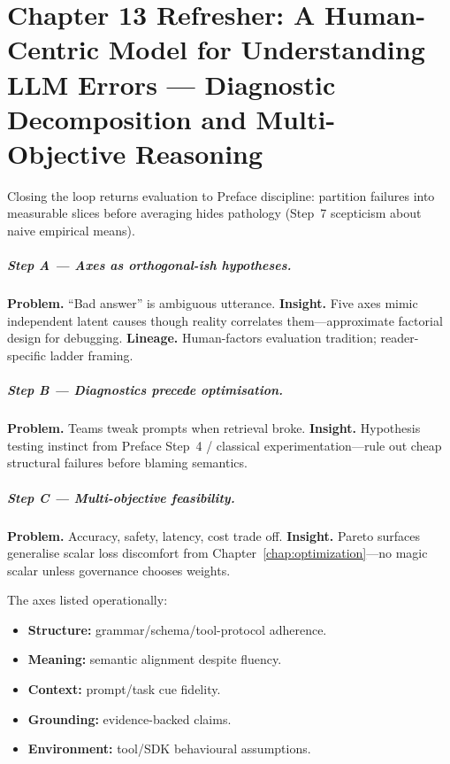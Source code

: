 \chapter{Chapter 13 Refresher: A Human-Centric Model for Understanding LLM Errors --- Diagnostic Decomposition and Multi-Objective Reasoning}
\label{chap:error-model}

\scenelabel
Closing the loop returns evaluation to Preface discipline: partition failures into measurable slices before averaging hides pathology (Step~7 scepticism about naive empirical means).

\paragraph{Step A --- Axes as orthogonal-ish hypotheses.}
\textbf{Problem.} ``Bad answer'' is ambiguous utterance.
\textbf{Insight.} Five axes mimic independent latent causes though reality correlates them---approximate factorial design for debugging.
\textbf{Lineage.} Human-factors evaluation tradition; reader-specific ladder framing.

\paragraph{Step B --- Diagnostics precede optimisation.}
\textbf{Problem.} Teams tweak prompts when retrieval broke.
\textbf{Insight.} Hypothesis testing instinct from Preface Step~4 / classical experimentation---rule out cheap structural failures before blaming semantics.

\paragraph{Step C --- Multi-objective feasibility.}
\textbf{Problem.} Accuracy, safety, latency, cost trade off.
\textbf{Insight.} Pareto surfaces generalise scalar loss discomfort from Chapter~\ref{chap:optimization}---no magic scalar unless governance chooses weights.

The axes listed operationally:
\begin{itemize}[leftmargin=1.5em]
  \item \textbf{Structure:} grammar/schema/tool-protocol adherence.
  \item \textbf{Meaning:} semantic alignment despite fluency.
  \item \textbf{Context:} prompt/task cue fidelity.
  \item \textbf{Grounding:} evidence-backed claims.
  \item \textbf{Environment:} tool/SDK behavioural assumptions.
\end{itemize}

